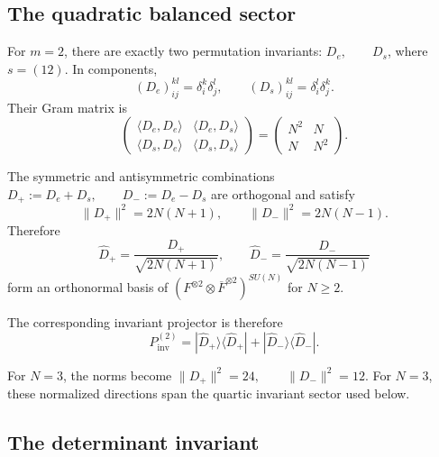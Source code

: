 \documentclass[11pt]{article}
\theoremstyle{plain}
\theoremstyle{definition}
\begin{document}
\subsection{The quadratic balanced sector}
\label{subsec:quadratic-balanced}

For \(m=2\), there are exactly two permutation invariants:
\(D_e, \qquad D_s\),
where \(s=(12)\). In components,
\[
(D_e)_{ij}^{kl}
=
\delta_i^k\delta_j^l,
\qquad
(D_s)_{ij}^{kl}
=
\delta_i^l\delta_j^k.
\]
Their Gram matrix is
\begin{equation}
\label{eq:m2-Gram}
\begin{pmatrix}
\langle D_e,D_e\rangle
&
\langle D_e,D_s\rangle
\\
\langle D_s,D_e\rangle
&
\langle D_s,D_s\rangle
\end{pmatrix}
=
\begin{pmatrix}
N^2&N\\
N&N^2
\end{pmatrix}.
\end{equation}

The symmetric and antisymmetric combinations \(D_+:=D_e+D_s, \qquad D_-:=D_e-D_s\) are orthogonal and satisfy
\begin{equation}
\label{eq:Dpm-norms}
\lVert D_+\rVert^2
=
2N(N+1),
\qquad
\lVert D_-\rVert^2
=
2N(N-1).
\end{equation}
Therefore
\begin{equation}
\label{eq:Dpm-normalized}
\widehat D_+
=
\frac{D_+}{\sqrt{2N(N+1)}},
\qquad
\widehat D_-
=
\frac{D_-}{\sqrt{2N(N-1)}}
\end{equation}
form an orthonormal basis of \(\left( F^{\otimes2}\otimes\overline F^{\otimes2} \right)^{SU(N)}\) for \(N\geq2\).

The corresponding invariant projector is therefore
\begin{equation}
\label{eq:m2-invariant-projector}
P_{\mathrm{inv}}^{(2)}
=
|\widehat D_+\rangle\langle\widehat D_+|
+
|\widehat D_-\rangle\langle\widehat D_-|.
\end{equation}

For \(N=3\), the norms become
\(\lVert D_+\rVert^2=24, \qquad \lVert D_-\rVert^2=12\).
For \(N=3\), these normalized directions span the quartic invariant sector used below.

\subsection{The determinant invariant}
\label{subsec:determinant-invariant}
\end{document}
